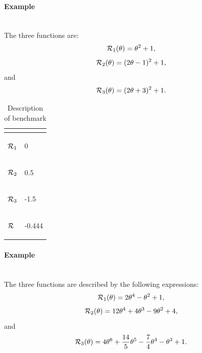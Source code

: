 \paragraph{Example \exFive}
~~\\
The three functions are:
\begin{equation*}
	\mathcal{R}_1(\theta) = \theta^2+1,
\end{equation*}
\begin{equation*}
	\mathcal{R}_2(\theta) = (2\theta-1)^2+1,
\end{equation*}
and
\begin{equation*}
	\mathcal{R}_3(\theta) = (2\theta+3)^2+1.
\end{equation*}

\begin{table}[h!]
	\centering
	\caption{Description of benchmark \exFive}
	\begin{tabular}{ll}
		
		\toprule
		\begin{bf} \diagbox{Functions}{Minimums} \end{bf} & \begin{bf}\mg\end{bf} \\ \midrule
		
		\begin{bf}$\mathcal{R}_1$\end{bf} & 0 \\ \midrule
		\begin{bf}$\mathcal{R}_2$\end{bf} & 0.5  \\ \midrule
		\begin{bf}$\mathcal{R}_3$\end{bf} & -1.5  \\ \midrule
		\begin{bf}$\mathcal{R}$\end{bf}   & -0.444  \\ \bottomrule
	\end{tabular}
	\label{ex5_example}
\end{table}

\paragraph{Example \exSix}
~~\\
The three functions are described by the following expressions:
\begin{equation*}
	\mathcal{R}_1(\theta) = 2\theta^4-\theta^2+1,
\end{equation*}
\begin{equation*}
	\mathcal{R}_2(\theta) = 12\theta^4+4\theta^3-9\theta^2+4,
\end{equation*}
and
\begin{equation*}
	\mathcal{R}_3(\theta) = 4\theta^6+\frac{14}{5}\theta^5-\frac{7}{4}\theta^4-\theta^3+1.
\end{equation*}

